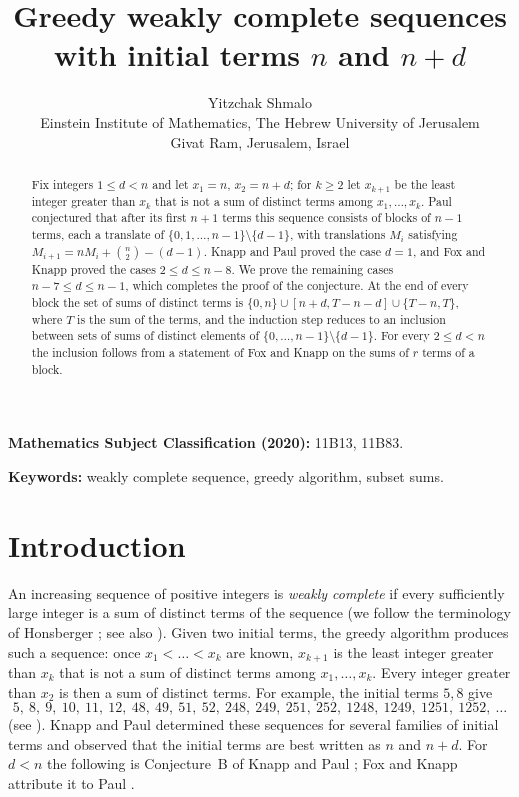 \documentclass[11pt]{article}
\title{Greedy weakly complete sequences with initial terms $n$ and $n+d$}
\author{Yitzchak Shmalo\\
Einstein Institute of Mathematics, The Hebrew University of Jerusalem\\
Givat Ram, Jerusalem, Israel}
\date{}
\theoremstyle{remark}
\begin{document}
\maketitle

\begin{abstract}
Fix integers $1\le d<n$ and let $x_1=n$, $x_2=n+d$; for $k\ge 2$ let $x_{k+1}$ be the least integer greater than
$x_k$ that is not a sum of distinct terms among $x_1,\dots,x_k$. Paul conjectured that after its first $n+1$
terms this sequence consists of blocks of $n-1$ terms, each a translate of $\{0,1,\dots,n-1\}\setminus\{d-1\}$, with
translations $M_i$ satisfying $M_{i+1}=nM_i+\binom n2-(d-1)$. Knapp and Paul proved the case $d=1$, and Fox and Knapp proved the cases
$2\le d\le n-8$. We prove the remaining cases $n-7\le d\le n-1$, which completes the proof of the conjecture. At
the end of every block the set of sums of distinct terms is $\{0,n\}\cup[n+d,T-n-d]\cup\{T-n,T\}$, where $T$ is the
sum of the terms, and the induction step reduces to an inclusion between sets of sums of distinct elements of
$\{0,\dots,n-1\}\setminus\{d-1\}$. For every $2\le d<n$ the inclusion follows from a statement of Fox and Knapp on
the sums of $r$ terms of a block.
\end{abstract}

\noindent\textbf{Mathematics Subject Classification (2020):} 11B13, 11B83.

\noindent\textbf{Keywords:} weakly complete sequence, greedy algorithm, subset sums.

\section{Introduction}

An increasing sequence of positive integers is \emph{weakly complete} if every sufficiently large integer is a sum of
distinct terms of the sequence (we follow the terminology of Honsberger \cite{Hon}; see also \cite{KP}). Given two initial terms, the greedy algorithm produces such a sequence:
once $x_1<\dots<x_k$ are known, $x_{k+1}$ is the least integer greater than $x_k$ that is not a sum of distinct terms
among $x_1,\dots,x_k$. Every integer greater than $x_2$ is then a sum of distinct terms. For example, the initial
terms $5,8$ give
\[
5,\ 8,\ 9,\ 10,\ 11,\ 12,\ 48,\ 49,\ 51,\ 52,\ 248,\ 249,\ 251,\ 252,\ 1248,\ 1249,\ 1251,\ 1252,\ \dots
\]
(see \cite{FK}). Knapp and Paul \cite{KP} determined these sequences for several families of initial terms and
observed that the initial terms are best written as $n$ and $n+d$. For $d<n$ the following is Conjecture~B of
Knapp and Paul \cite{KP}; Fox and Knapp attribute it to Paul \cite{FK}.
\end{document}

